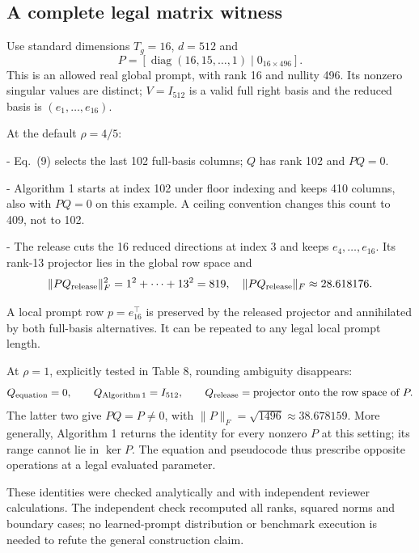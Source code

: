 \documentclass[10pt]{article}
\begin{document}
\subsection*{A complete legal matrix witness}
Use standard dimensions \(T_g=16\), \(d=512\) and \[P=[\operatorname{diag}(16,15,\ldots,1)\mid0_{16\times496}].\] This is an allowed real global prompt, with rank 16 and nullity 496. Its nonzero singular values are distinct; \(V=I_{512}\) is a valid full right basis and the reduced basis is \((e_1,\ldots,e_{16})\).\par
At the default \(\rho=4/5\):\par
- Eq. (9) selects the last 102 full-basis columns; \(Q\) has rank 102 and \(PQ=0\).\par
- Algorithm 1 starts at index 102 under floor indexing and keeps 410 columns, also with \(PQ=0\) on this example. A ceiling convention changes this count to 409, not to 102.\par
- The release cuts the 16 reduced directions at index 3 and keeps \(e_4,\ldots,e_{16}\). Its rank-13 projector lies in the global row space and \[\|PQ_{\rm release}\|_F^2=1^2+\cdots+13^2=819,
 \quad \|PQ_{\rm release}\|_F\approx28.618176.\]\par
A local prompt row \(p=e_{16}^{\top}\) is preserved by the released projector and annihilated by both full-basis alternatives. It can be repeated to any legal local prompt length.\par
At \(\rho=1\), explicitly tested in Table 8, rounding ambiguity disappears: \[Q_{\rm equation}=0,\qquad Q_{\rm Algorithm\,1}=I_{512},\qquad
 Q_{\rm release}=\text{projector onto the row space of }P.\] The latter two give \(PQ=P\ne0\), with \(\|P\|_F=\sqrt{1496}\approx38.678159\). More generally, Algorithm 1 returns the identity for every nonzero \(P\) at this setting; its range cannot lie in \(\ker P\). The equation and pseudocode thus prescribe opposite operations at a legal evaluated parameter.\par
These identities were checked analytically and with independent reviewer calculations. The independent check recomputed all ranks, squared norms and boundary cases; no learned-prompt distribution or benchmark execution is needed to refute the general construction claim.\par
\end{document}
